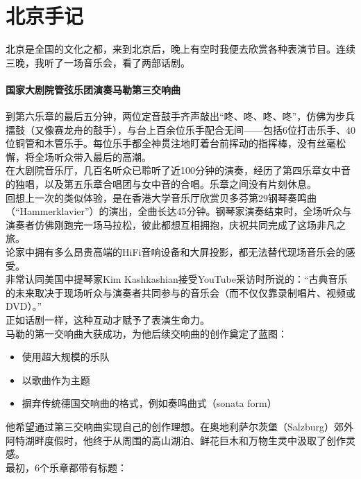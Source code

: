 \chapter{北京手记} %


北京是全国的文化之都，来到北京后，晚上有空时我便去欣赏各种表演节目。连续三晚，我听了一场音乐会，看了两部话剧。

\hypertarget{ux56fdux5bb6ux5927ux5267ux9662ux7ba1ux5f26ux4e50ux56e2ux6f14ux594fux9a6cux52d2ux7b2cux4e09ux4ea4ux54cdux66f2}{%
\subsubsection{国家大剧院管弦乐团演奏马勒第三交响曲}\label{ux56fdux5bb6ux5927ux5267ux9662ux7ba1ux5f26ux4e50ux56e2ux6f14ux594fux9a6cux52d2ux7b2cux4e09ux4ea4ux54cdux66f2}}

到第六乐章的最后五分钟，两位定音鼓手齐声敲出``咚、咚、咚、咚''，仿佛为步兵擂鼓（又像赛龙舟的鼓手），与台上百余位乐手配合无间------包括6位打击乐手、40位铜管和木管乐手。每位乐手都全神贯注地盯着台前挥动的指挥棒，没有丝毫松懈，将全场听众带入最后的高潮。\\
在大剧院音乐厅，几百名听众已聆听了近100分钟的演奏，经历了第四乐章女中音的独唱，以及第五乐章合唱团与女中音的合唱。乐章之间没有片刻休息。\\
回想上一次的类似体验，是在香港大学音乐厅欣赏贝多芬第29钢琴奏鸣曲（``Hammerklavier''）的演出，全曲长达45分钟。钢琴家演奏结束时，全场听众与演奏者仿佛刚跑完一场马拉松，彼此都想互相拥抱，庆祝共同完成了这场非凡之旅。\\
论家中拥有多么昂贵高端的HiFi音响设备和大屏投影，都无法替代现场音乐会的感受。\\
非常认同美国中提琴家Kim
Kashkashian接受YouTube采访时所说的：``古典音乐的未来取决于现场听众与演奏者共同参与的音乐会（而不仅仅靠录制唱片、视频或DVD）。''\\
正如话剧一样，这种互动才赋予了表演生命力。\\
马勒的第一交响曲大获成功，为他后续交响曲的创作奠定了蓝图：

\begin{itemize}
\tightlist
\item
  使用超大规模的乐队
\item
  以歌曲作为主题
\item
  摒弃传统德国交响曲的格式，例如奏鸣曲式（sonata form）\\
\end{itemize}

他希望通过第三交响曲实现自己的创作理想。在奥地利萨尔茨堡（Salzburg）郊外阿特湖畔度假时，他终于从周围的高山湖泊、鲜花巨木和万物生灵中汲取了创作灵感。\\
最初，6个乐章都带有标题：

